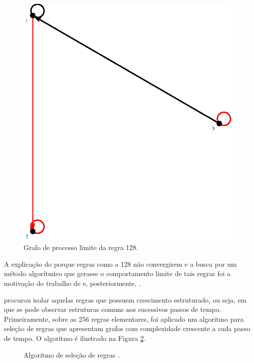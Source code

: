 \documentclass[12pt,a4paper]{article}
\begin{document}
\begin{figure}[htp]
\begin{center}
\includegraphics[scale=1.0]{img/limit128.eps}
\caption{Grafo de processo limite da regra 128.}
\label{fig:limit128}
\end{center}
\end{figure}

A explicação do porque regras como a 128 não convergirem e a busca por um
método algorítmico que gerasse o comportamento limite de tais regras foi
a motivação do trabalho de  e, posteriormente,
.

 procurou isolar aquelas regras
que possuem crescimento estruturado, ou seja, em que se pode observar
estruturas comuns nos sucessivos passos de tempo. Primeiramente, sobre as
256 regras elementares, foi aplicado um algoritmo para seleção de regras
que apresentam grafos com complexidade crescente a cada passo de tempo. O
algoritmo é ilustrado na Figura \ref{fig:rulesel}.

\begin{figure}[htp]
\begin{center}

\centerline{\box\graph}
\caption{Algoritmo de seleção de regras .}
\label{fig:rulesel}
\end{center}
\end{figure}
\end{document}
